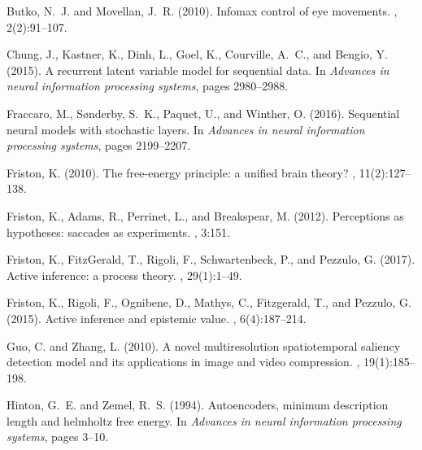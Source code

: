 \documentclass[12pt,twoside,openright]{article}
\begin{document}
{\begin{thebibliography}{}
	Butko, N.~J. and Movellan, J.~R. (2010).
	\newblock Infomax control of eye movements.
	,
	2(2):91--107.
	
	Chung, J., Kastner, K., Dinh, L., Goel, K., Courville, A.~C., and Bengio, Y.
	(2015).
	\newblock A recurrent latent variable model for sequential data.
	\newblock In {\em Advances in neural information processing systems}, pages
	2980--2988.
	
	Fraccaro, M., S{\o}nderby, S.~K., Paquet, U., and Winther, O. (2016).
	\newblock Sequential neural models with stochastic layers.
	\newblock In {\em Advances in neural information processing systems}, pages
	2199--2207.
	
	Friston, K. (2010).
	\newblock The free-energy principle: a unified brain theory?
	, 11(2):127--138.
	
	Friston, K., Adams, R., Perrinet, L., and Breakspear, M. (2012).
	\newblock Perceptions as hypotheses: saccades as experiments.
	, 3:151.
	
	Friston, K., FitzGerald, T., Rigoli, F., Schwartenbeck, P., and Pezzulo, G.
	(2017).
	\newblock Active inference: a process theory.
	, 29(1):1--49.
	
	Friston, K., Rigoli, F., Ognibene, D., Mathys, C., Fitzgerald, T., and Pezzulo,
	G. (2015).
	\newblock Active inference and epistemic value.
	, 6(4):187--214.
	
	Guo, C. and Zhang, L. (2010).
	\newblock A novel multiresolution spatiotemporal saliency detection model and
	its applications in image and video compression.
	, 19(1):185--198.
	
	Hinton, G.~E. and Zemel, R.~S. (1994).
	\newblock Autoencoders, minimum description length and helmholtz free energy.
	\newblock In {\em Advances in neural information processing systems}, pages
	3--10.
	

\end{thebibliography}}
\end{document}
